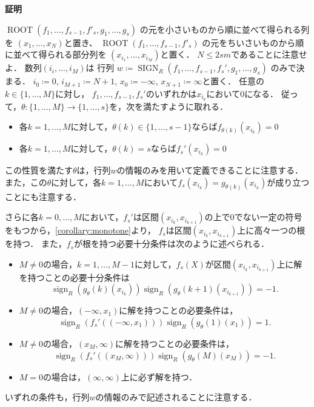 \documentclass[uplatex, dvipdfmx]{jsarticle}
\makeatletter
\numberwithin{equation}{section}
\renewenvironment{proof}[1][\proofname]{\par
  \pushQED{\qed}%
  \normalfont \topsep6\p@\@plus6\p@\relax
  \trivlist
  \item\relax
  {\bfseries
  #1\@addpunct{.}}\hspace\labelsep\ignorespaces
}{
  \popQED\endtrivlist\@endpefalse
}
\newcommand{\map}[3]{{#1}\colon{#2}\rightarrow{#3}}
\DeclareMathOperator{\sign}{sign}
\DeclareMathOperator{\SIGN}{SIGN}
\DeclareMathOperator{\ROOT}{ROOT}
\theoremstyle{definition}
\renewcommand{\proofname}{\textbf{証明}}
\makeatother
\begin{document}
\begin{proof}
     $\ROOT(f_1, \dots, f_{s-1}, f'_s, g_1, \dots, g_s)$
     の元を小さいものから順に並べて得られる列を
     $(x_1, \dots, x_N)$と置き、
     $\ROOT(f_1,\ldots, f_{s-1}, f'_s)$
     の元をちいさいものから順に並べて得られる部分列を
     $(x_{i_1}, \dots, x_{i_M})$と置く．
     $N \leq 2sm$であることに注意せよ．
     数列$(i_i, \dots, i_M)$は
     行列
     $
     w \coloneqq
     \SIGN_R(f_1, \dots, f_{s-1}, f_s', g_1, \dots, g_s)
     $
     のみで決まる．
     $i_0\coloneqq 0$, $i_{M+1}\coloneqq N+1$, $x_0\coloneqq -\infty$, $x_{N+1}\coloneqq \infty$と置く．
     任意の$k \in \{1, \dots, M \}$に対し，
     $f_1, \dots, f_{s-1}, f_s'$のいずれかは$x_{i_k}$において$0$になる．
     従って，$\map{\theta}{\{1,\dots, M\}}{\{1, \dots, s\}}$を，次を満たすように取れる．
     \begin{itemize}
          \item 各$k=1, \dots, M$に対して，$\theta(k) \in \{1, \dots, s-1\}$ならば$f_{\theta(k)}(x_{i_k})=0$
          \item 各$k=1, \dots, M$に対して，$\theta(k)=s$ならば$f_s'(x_{i_k}) = 0$
     \end{itemize}
     この性質を満たす$\theta$は，行列$w$の情報のみを用いて定義できることに注意する．
     また，この$\theta$に対して，各$k=1, \dots, M$において$f_s(x_{i_k}) = g_{\theta(k)}(x_{i_k})$が成り立つことにも注意する．

     さらに各$k=0, \dots, M$において，$f_s'$は区間$(x_{i_k}, x_{i_{k+1}})$の上で$0$でない一定の符号をもつから，\cref{corollary:monotone}より，
     $f_s$は区間$(x_{i_k}, x_{i_{k+1}})$上に高々一つの根を持つ．
     また，$f_s$が根を持つ必要十分条件は次のように述べられる．
     \begin{itemize}
          \item $M\neq0$の場合，$k=1, \dots, M-1$に対して，$f_s(X)$が区間$(x_{i_k}, x_{i_{k+1}})$上に解を持つことの必要十分条件は
          \begin{equation}
               \sign_R(g_\theta(k)(x_{i_k}))\sign_R(g_\theta(k+1)(x_{i_{k+1}})) = -1.
          \end{equation}
          \item $M\neq0$の場合，$(-\infty, x_1)$に解を持つことの必要条件は，
          \begin{equation}
               \sign_R(f_s'((-\infty, x_1))) \sign_R(g_\theta(1)(x_1)) = 1.
          \end{equation}
          \item $M\neq0$の場合，$(x_M, \infty)$に解を持つことの必要条件は，
          \begin{equation}
               \sign_R(f_s'((x_M, \infty))) \sign_R(g_\theta(M)(x_M)) = -1.
          \end{equation}
          \item $M = 0$の場合は，$(\infty, \infty)$上に必ず解を持つ．
     \end{itemize}
     いずれの条件も，行列$w$の情報のみで記述されることに注意する．


\end{proof}
\end{document}
